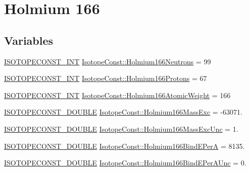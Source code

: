 \hypertarget{group___isotope_const-_holmium-_ho166}{}\section{Holmium 166}
\label{group___isotope_const-_holmium-_ho166}
\subsection*{Variables}
\begin{DoxyCompactItemize}
\item 
\mbox{\hyperlink{group___isotope_const-_macros_ga5f18360b3e99483a35c32d789e62621c}{I\+S\+O\+T\+O\+P\+E\+C\+O\+N\+S\+T\+\_\+\+I\+NT}} \mbox{\hyperlink{group___isotope_const-_holmium-_ho166_ga9c826dac5aa63babb8c9dfc76cdf0f2e}{Isotope\+Const\+::\+Holmium166\+Neutrons}} = 99
\item 
\mbox{\hyperlink{group___isotope_const-_macros_ga5f18360b3e99483a35c32d789e62621c}{I\+S\+O\+T\+O\+P\+E\+C\+O\+N\+S\+T\+\_\+\+I\+NT}} \mbox{\hyperlink{group___isotope_const-_holmium-_ho166_gaba154e7b6e2a087d64e8bce3d1561e91}{Isotope\+Const\+::\+Holmium166\+Protons}} = 67
\item 
\mbox{\hyperlink{group___isotope_const-_macros_ga5f18360b3e99483a35c32d789e62621c}{I\+S\+O\+T\+O\+P\+E\+C\+O\+N\+S\+T\+\_\+\+I\+NT}} \mbox{\hyperlink{group___isotope_const-_holmium-_ho166_ga1436ac0f3e072dc56649e03d11dd27ce}{Isotope\+Const\+::\+Holmium166\+Atomic\+Weight}} = 166
\item 
\mbox{\hyperlink{group___isotope_const-_macros_ga8f45a7272ce02c0b4c65c44636ed719a}{I\+S\+O\+T\+O\+P\+E\+C\+O\+N\+S\+T\+\_\+\+D\+O\+U\+B\+LE}} \mbox{\hyperlink{group___isotope_const-_holmium-_ho166_ga3f734cde5fe1719bf793d64555aefdb5}{Isotope\+Const\+::\+Holmium166\+Mass\+Exc}} = -\/63071.
\item 
\mbox{\hyperlink{group___isotope_const-_macros_ga8f45a7272ce02c0b4c65c44636ed719a}{I\+S\+O\+T\+O\+P\+E\+C\+O\+N\+S\+T\+\_\+\+D\+O\+U\+B\+LE}} \mbox{\hyperlink{group___isotope_const-_holmium-_ho166_gaddeb0cbd067852f6a304f5289a42dfcb}{Isotope\+Const\+::\+Holmium166\+Mass\+Exc\+Unc}} = 1.
\item 
\mbox{\hyperlink{group___isotope_const-_macros_ga8f45a7272ce02c0b4c65c44636ed719a}{I\+S\+O\+T\+O\+P\+E\+C\+O\+N\+S\+T\+\_\+\+D\+O\+U\+B\+LE}} \mbox{\hyperlink{group___isotope_const-_holmium-_ho166_gae86713a7e710f98bee3a86f8c7ac36df}{Isotope\+Const\+::\+Holmium166\+Bind\+E\+PerA}} = 8135.
\item 
\mbox{\hyperlink{group___isotope_const-_macros_ga8f45a7272ce02c0b4c65c44636ed719a}{I\+S\+O\+T\+O\+P\+E\+C\+O\+N\+S\+T\+\_\+\+D\+O\+U\+B\+LE}} \mbox{\hyperlink{group___isotope_const-_holmium-_ho166_ga0d69bec4381acaf3a94952c7821b35a7}{Isotope\+Const\+::\+Holmium166\+Bind\+E\+Per\+A\+Unc}} = 0.

\end{DoxyCompactItemize}
